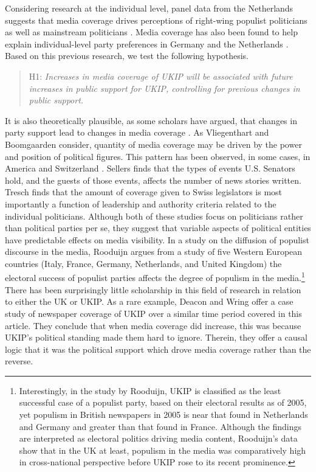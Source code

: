 \documentclass[12pt,]{article}
\begin{document}
Considering research at the individual level, panel data from the
Netherlands suggests that media coverage drives perceptions of
right-wing populist politicians as well as mainstream politicians
\citep{Bos:2011iy}. Media coverage has also been found to help explain
individual-level party preferences in Germany
\citep{semetko_germanys_1994} and the Netherlands
\citep{oegema_personalization_2009}. Based on this previous research, we
test the following hypothesis.

\begin{quote}
H1: \emph{Increases in media coverage of UKIP will be associated with future
increases in public support for UKIP, controlling for previous changes
in public support.}
\end{quote}

It is also theoretically plausible, as some scholars have argued, that
changes in party support lead to changes in media coverage
\citep{pauwels_reassessing_2010}. As Vliegenthart and Boomgaarden
\citeyearpar{vliegenthart_why_2010} consider, quantity of media coverage
may be driven by the power and position of political figures. This
pattern has been observed, in some cases, in America
\citep{sellers_winning_2007} and Switzerland
\citep{tresch_politicians_2009}. Sellers
\citeyearpar{sellers_winning_2007} finds that the types of events U.S.
Senators hold, and the guests of those events, affects the number of
news stories written. Tresch \citeyearpar{tresch_politicians_2009} finds
that the amount of coverage given to Swiss legislators is most
importantly a function of leadership and authority criteria related to
the individual politicians. Although both of these studies focus on
politicians rather than political parties per se, they suggest that
variable aspects of political entities have predictable effects on media
visibility. In a study on the diffusion of populist discourse in the
media, Rooduijn \citeyearpar{rooduijn_mesmerising_2014} argues from a
study of five Western European countries (Italy, France, Germany,
Netherlands, and United Kingdom) the electoral success of populist
parties affects the degree of populism in the
media.\footnote{Interestingly, in the study by Rooduijn, UKIP is classified as the least successful case of a populist party, based on their electoral results as of 2005, yet populism in British newspapers in 2005 is near that found in Netherlands and Germany and greater than that found in France. Although the findings are interpreted as electoral politics driving media content, Rooduijn's data show that in the UK at least, populism in the media was comparatively high in cross-national perspective before UKIP rose to its recent prominence.}
There has been surprisingly little scholarship in this field of research
in relation to either the UK or UKIP. As a rare example, Deacon and
Wring \citeyearpar{deacon_uk_2015} offer a case study of newspaper
coverage of UKIP over a similar time period covered in this article.
They conclude that when media coverage did increase, this was because
UKIP's political standing made them hard to ignore. Therein, they offer
a causal logic that it was the political support which drove media
coverage rather than the reverse.
\end{document}
